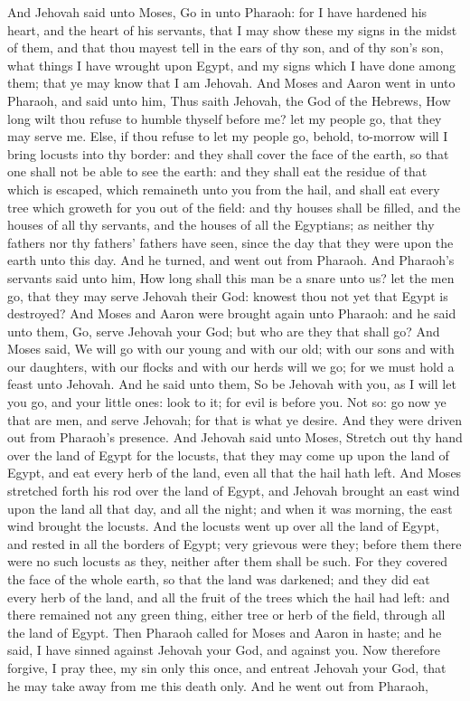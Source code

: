 And Jehovah said unto Moses, Go in unto Pharaoh: for I have hardened his heart, and the heart of his servants, that I may show these my signs in the midst of them, and that thou mayest tell in the ears of thy son, and of thy son’s son, what things I have wrought upon Egypt, and my signs which I have done among them; that ye may know that I am Jehovah. And Moses and Aaron went in unto Pharaoh, and said unto him, Thus saith Jehovah, the God of the Hebrews, How long wilt thou refuse to humble thyself before me? let my people go, that they may serve me. Else, if thou refuse to let my people go, behold, to-morrow will I bring locusts into thy border: and they shall cover the face of the earth, so that one shall not be able to see the earth: and they shall eat the residue of that which is escaped, which remaineth unto you from the hail, and shall eat every tree which groweth for you out of the field: and thy houses shall be filled, and the houses of all thy servants, and the houses of all the Egyptians; as neither thy fathers nor thy fathers’ fathers have seen, since the day that they were upon the earth unto this day. And he turned, and went out from Pharaoh. And Pharaoh’s servants said unto him, How long shall this man be a snare unto us? let the men go, that they may serve Jehovah their God: knowest thou not yet that Egypt is destroyed? And Moses and Aaron were brought again unto Pharaoh: and he said unto them, Go, serve Jehovah your God; but who are they that shall go? And Moses said, We will go with our young and with our old; with our sons and with our daughters, with our flocks and with our herds will we go; for we must hold a feast unto Jehovah. And he said unto them, So be Jehovah with you, as I will let you go, and your little ones: look to it; for evil is before you. Not so: go now ye that are men, and serve Jehovah; for that is what ye desire. And they were driven out from Pharaoh’s presence.  And Jehovah said unto Moses, Stretch out thy hand over the land of Egypt for the locusts, that they may come up upon the land of Egypt, and eat every herb of the land, even all that the hail hath left. And Moses stretched forth his rod over the land of Egypt, and Jehovah brought an east wind upon the land all that day, and all the night; and when it was morning, the east wind brought the locusts. And the locusts went up over all the land of Egypt, and rested in all the borders of Egypt; very grievous were they; before them there were no such locusts as they, neither after them shall be such. For they covered the face of the whole earth, so that the land was darkened; and they did eat every herb of the land, and all the fruit of the trees which the hail had left: and there remained not any green thing, either tree or herb of the field, through all the land of Egypt. Then Pharaoh called for Moses and Aaron in haste; and he said, I have sinned against Jehovah your God, and against you. Now therefore forgive, I pray thee, my sin only this once, and entreat Jehovah your God, that he may take away from me this death only. And he went out from Pharaoh, 